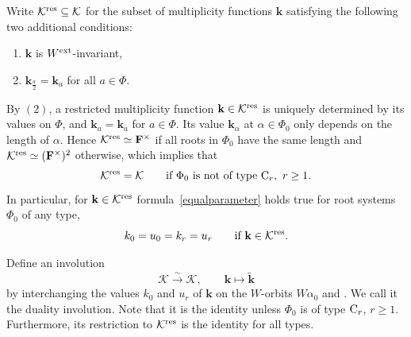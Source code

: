 \documentclass[11pt]{article}
\numberwithin{equation}{section}
\numberwithin{equation}{section}
\begin{document}
Write $\mathcal{K}^{{\rm res}}\subseteq\mathcal{K}$ for the subset of multiplicity functions $\mathbf{k}$ satisfying the following
two additional conditions:
\begin{enumerate}\itemsep=0pt
\item[$ (1)$] $\mathbf{k}$ is $W^{\textup{ext}}$-invariant,
\item[$(2)$] $\mathbf{k}_{\frac{a}{2}}=\mathbf{k}_a$ for all $a\in\Phi$.
\end{enumerate}
By $(2)$, a restricted multiplicity function $\mathbf{k}\in\mathcal{K}^{{\rm res}}$ is uniquely determined by its values on $\Phi$, and $\mathbf{k}_a=\mathbf{k}_{\overline{a}}$ for $a\in\Phi$. Its value $\mathbf{k}_\alpha$ at $\alpha\in\Phi_0$ only depends on the length of $\alpha$. Hence $\mathcal{K}^{{\rm res}}\simeq\mathbf{F}^\times$ if all roots in $\Phi_0$ have the same length and
$\mathcal{K}^{{\rm res}}\simeq (\mathbf{F}^\times)^2$ otherwise, which implies that
\[
\mathcal{K}^{{\rm res}}=\mathcal{K}\qquad \textup{if }  \Phi_0 \ \textup{is not of type}\ {\rm C}_r,\ r\geq 1.
\]
In particular, for $\mathbf{k}\in\mathcal{K}^{{\rm res}}$ formula~\eqref{equalparameter} holds true for root systems $\Phi_0$ of any type,
\[
k_0=u_0=k_r=u_r\qquad \text{if}\ \mathbf{k}\in\mathcal{K}^{{\rm res}}.
\]

Define an involution
\begin{equation*}%
\mathcal{K}\overset{\sim}{\longrightarrow}\mathcal{K},\qquad \mathbf{k}\mapsto \widetilde{\mathbf{k}}
\end{equation*}
by interchanging the values $k_0$ and $u_r$ of $\mathbf{k}$ on the $W$-orbits $W\alpha_0$ and . We call it the duality involution.
Note that it is the identity unless $\Phi_0$ is of type ${\rm C}_r$, $r\geq 1$. Furthermore, its restriction to $\mathcal{K}^{{\rm res}}$ is the identity for all types.
\end{document}
